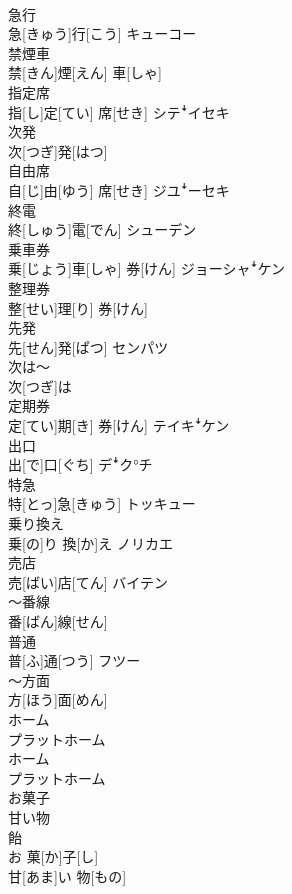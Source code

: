 \documentclass[8pt]{extreport}
\begin{document}
\begin{CJK}{UTF8}{min}
\\	急行	
\\	急[きゅう]行[こう]	キューコー
\\	禁煙車	
\\	禁[きん]煙[えん] 車[しゃ]	
\\	指定席	
\\	指[し]定[てい] 席[せき]	シテꜜイセキ
\\	次発	
\\	次[つぎ]発[はつ]	
\\	自由席	
\\	自[じ]由[ゆう] 席[せき]	ジユꜜーセキ
\\	終電	
\\	終[しゅう]電[でん]	シューデン
\\	乗車券	
\\	乗[じょう]車[しゃ] 券[けん]	ジョーシャꜜケン
\\	整理券	
\\	整[せい]理[り] 券[けん]	
\\	先発	
\\	先[せん]発[ぱつ]	センパツ
\\	次は～	
\\	次[つぎ]は~	
\\	定期券	
\\	定[てい]期[き] 券[けん]	テイキꜜケン
\\	出口	
\\	出[で]口[ぐち]	デꜜク°チ
\\	特急	
\\	特[とっ]急[きゅう]	トッキュー
\\	乗り換え	
\\	乗[の]り 換[か]え	ノリカエ
\\	売店	
\\	売[ばい]店[てん]	バイテン
\\	～番線	
\\	番[ばん]線[せん]	
\\	普通	
\\	普[ふ]通[つう]	フツー
\\	～方面	
\\	方[ほう]面[めん]	
\\	ホーム 
\\	プラットホーム	
\\	ホーム 
\\	プラットホーム	
\\	お菓子 
\\	甘い物 
\\	飴	
\\	お 菓[か]子[し] 
\\	甘[あま]い 物[もの] 

\end{CJK}
\end{document}
